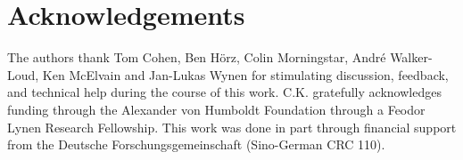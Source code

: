 \section*{Acknowledgements}\label{sec:acknowledgements}

The authors thank
Tom Cohen,
Ben H\"{o}rz,
Colin Morningstar,
Andr\'{e} Walker-Loud,
Ken McElvain
and
Jan-Lukas Wynen
for stimulating discussion, feedback, and technical help during the course of this work.
C.K. gratefully acknowledges funding through the Alexander von Humboldt Foundation through a Feodor Lynen Research Fellowship.
This work was done in part through financial support from the Deutsche Forschungsgemeinschaft (Sino-German CRC 110).

